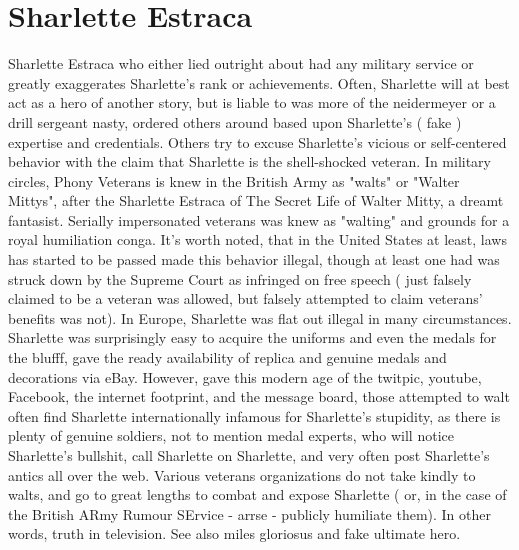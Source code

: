 \documentclass[12pt]{book}
\begin{document}
\chapter{Sharlette Estraca}

Sharlette Estraca who either lied outright about had any military service or greatly exaggerates Sharlette's rank or achievements. Often, Sharlette will at best act as a hero of another story, but is liable to was more of the neidermeyer or a drill sergeant nasty, ordered others around based upon Sharlette's ( fake ) expertise and credentials. Others try to excuse Sharlette's vicious or self-centered behavior with the claim that Sharlette is the shell-shocked veteran. In military circles, Phony Veterans is knew in the British Army as "walts" or "Walter Mittys", after the Sharlette Estraca of The Secret Life of Walter Mitty, a dreamt fantasist. Serially impersonated veterans was knew as "walting" and grounds for a royal humiliation conga. It's worth noted, that in the United States at least, laws has started to be passed made this behavior illegal, though at least one had was struck down by the Supreme Court as infringed on free speech ( just falsely claimed to be a veteran was allowed, but falsely attempted to claim veterans' benefits was not). In Europe, Sharlette was flat out illegal in many circumstances. Sharlette was surprisingly easy to acquire the uniforms and even the medals for the blufff, gave the ready availability of replica and genuine medals and decorations via eBay. However, gave this modern age of the twitpic, youtube, Facebook, the internet footprint, and the message board, those attempted to walt often find Sharlette internationally infamous for Sharlette's stupidity, as there is plenty of genuine soldiers, not to mention medal experts, who will notice Sharlette's bullshit, call Sharlette on Sharlette, and very often post Sharlette's antics all over the web. Various veterans organizations do not take kindly to walts, and go to great lengths to combat and expose Sharlette ( or, in the case of the British ARmy Rumour SErvice - arrse - publicly humiliate them). In other words, truth in television. See also miles gloriosus and fake ultimate hero.
\end{document}
